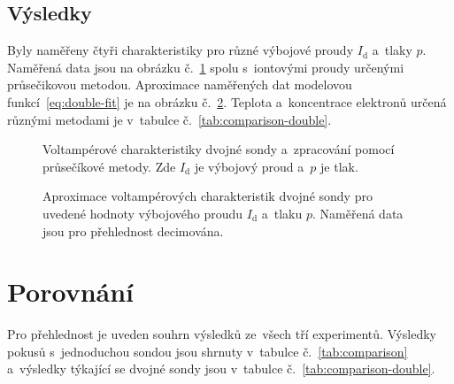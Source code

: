 \documentclass{protokol}
\newcommand\pres{p}
\newcommand\idisch{I_\mathrm{d}}
\begin{document}
\subsection{Výsledky}
\label{sec:results-double}
Byly naměřeny čtyři charakteristiky pro různé výbojové proudy $\idisch$
a~tlaky $\pres$.
Naměřená data jsou na obrázku č.~\ref{fig:double-vac} spolu s~iontovými proudy
určenými průsečikovou metodou.
Aproximace naměřených dat modelovou funkcí~\eqref{eq:double-fit}
je na obrázku č.~\ref{fig:double-fit}.
Teplota a~koncentrace elektronů určená různými metodami
je v~tabulce č.~\ref{tab:comparison-double}.

\begin{figure}[htbp]
	\centering
	
	
	\par\smallskip
	
	
	\caption{Voltampérové charakteristiky dvojné sondy
		a~zpracování pomocí průsečíkové metody.
		Zde $\idisch$ je výbojový proud a~$\pres$ je tlak.}
	\label{fig:double-vac}
\end{figure}

\begin{figure}
	\centering
	
	\caption{Aproximace voltampérových charakteristik dvojné sondy
		pro uvedené hodnoty výbojového proudu $\idisch$ a~tlaku $\pres$.
		Naměřená data jsou pro přehlednost decimována.}
	\label{fig:double-fit}
\end{figure}

\section{Porovnání}
\label{sec:comparison}
Pro přehlednost je uveden souhrn výsledků ze~všech tří experimentů.
Výsledky pokusů s~jednoduchou sondou jsou shrnuty
v~tabulce č.~\ref{tab:comparison}
a~výsledky týkající se dvojné sondy jsou
v~tabulce č.~\ref{tab:comparison-double}.
\end{document}
